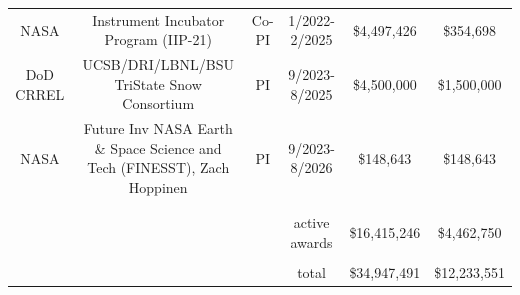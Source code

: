 \documentclass[11pt]{article}
\begin{document}
\begin{table}[!htbp]
\begin{tabular}{cccccc}
NASA             & Instrument Incubator Program (IIP-21)                                   & Co-PI & 1/2022-2/2025    & \$4,497,426  & \$354,698  \\
DoD CRREL        & UCSB/DRI/LBNL/BSU TriState Snow Consortium                              & PI    & 9/2023-8/2025    & \$4,500,000  & \$1,500,000  \\
NASA             & Future Inv NASA Earth \& Space Science and Tech (FINESST), Zach Hoppinen & PI    & 9/2023-8/2026    & \$148,643    & \$148,643   \\
                 &                                                                         &       &                  &             &   \\
                 &                                                                         &       &                  &             &    \\
                 &                                                                         &       & active awards    & \$16,415,246 & \$4,462,750  \\
                 &                                                                         &       &                  &             &   \\
                 &                                                                         &       & total            & \$34,947,491 & \$12,233,551  \\
\end{tabular}
\end{table}

\clearpage
\end{document}
